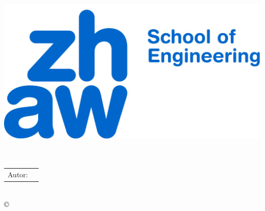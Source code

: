 \begin{titlepage}

\begin{center}
\includegraphics[scale=0.25]{pic/ZHAW_Titel}			%
\\[12ex]
\huge{\textbf{\textsc{\titel}}}							%
\\[1.5ex]
\LARGE{\textbf{\untertitel}}							%
\\[6ex]
\normalsize												%

\begin{tabular}{w{3cm}p{6cm}}
\\[12ex]Autor: & \quad \autorFirst						%
\end{tabular}
\\[24ex]
\copyright\ \jahr\\
\end{center}

\singlespacing											%
\small													%
\noindent												%




\end{titlepage}
